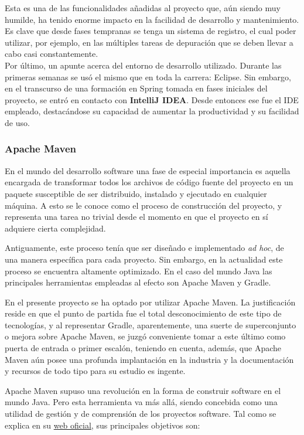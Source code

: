 \documentclass[a4paper]{article}
\begin{document}
	Esta es una de las funcionalidades añadidas al proyecto que, aún siendo muy humilde, ha tenido enorme impacto en la facilidad de desarrollo y mantenimiento. Es clave que desde fases tempranas se tenga un sistema de registro, el cual poder utilizar, por ejemplo, en las múltiples tareas de depuración que se deben llevar a cabo casi constantemente.
	\\
	
	Por último, un apunte acerca del entorno de desarrollo utilizado. Durante las primeras semanas se usó el mismo que en toda la carrera: Eclipse. Sin embargo, en el transcurso de una formación en Spring tomada en fases iniciales del proyecto, se entró en contacto con \textbf{IntelliJ IDEA}. Desde entonces ese fue el IDE empleado, destacándose su capacidad de aumentar la productividad y su facilidad de uso.

	\subsubsection{Apache Maven}
	En el mundo del desarrollo software una fase de especial importancia es aquella encargada de transformar todos los archivos de código fuente del proyecto en un paquete susceptible de ser distribuido, instalado y ejecutado en cualquier máquina. A esto se le conoce como el proceso de construcción del proyecto, y representa una tarea no trivial desde el momento en que el proyecto en sí adquiere cierta complejidad.
	
	Antiguamente, este proceso tenía que ser diseñado e implementado \emph{ad hoc}, de una manera específica para cada proyecto. Sin embargo, en la actualidad este proceso se encuentra altamente optimizado. En el caso del mundo Java las principales herramientas empleadas al efecto son Apache Maven y Gradle.
	
	En el presente proyecto se ha optado por utilizar Apache Maven. La justificación reside en que el punto de partida fue el total desconocimiento de este tipo de tecnologías, y al representar Gradle, aparentemente, una suerte de superconjunto o mejora sobre Apache Maven, se juzgó conveniente tomar a este último como puerta de entrada o primer escalón, teniendo en cuenta, además, que Apache Maven aún posee una profunda implantación en la industria y la documentación y recursos de todo tipo para su estudio es ingente.
	
	Apache Maven supuso una revolución en la forma de construir software en el mundo Java. Pero esta herramienta va más allá, siendo concebida como una utilidad de gestión y de comprensión de los proyectos software. Tal como se explica en su \href{https://maven.apache.org/what-is-maven.html}{web oficial}, sus principales objetivos son:
	
\end{document}
